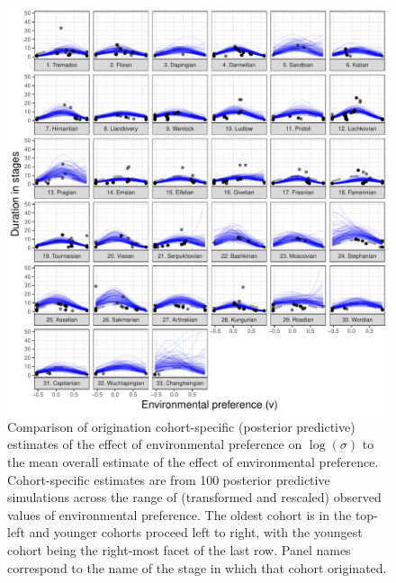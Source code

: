 \documentclass[11pt]{article}
\begin{document}
\begin{figure}[ht]
  \centering
  \includegraphics[width = \textwidth,height = 0.7\textheight,keepaspectratio=true]{figure/env_cohort_med_cweib_cens}
  \caption{Comparison of origination cohort-specific (posterior predictive) estimates of the effect of environmental preference on \(\log(\sigma)\) to the mean overall estimate of the effect of environmental preference. Cohort-specific estimates are from 100 posterior predictive simulations across the range of (transformed and rescaled) observed values of environmental preference. The oldest cohort is in the top-left and younger cohorts proceed left to right, with the youngest cohort being the right-most facet of the last row. Panel names correspond to the name of the stage in which that cohort originated.}
  \label{fig:env_cohort}
\end{figure}
\end{document}
